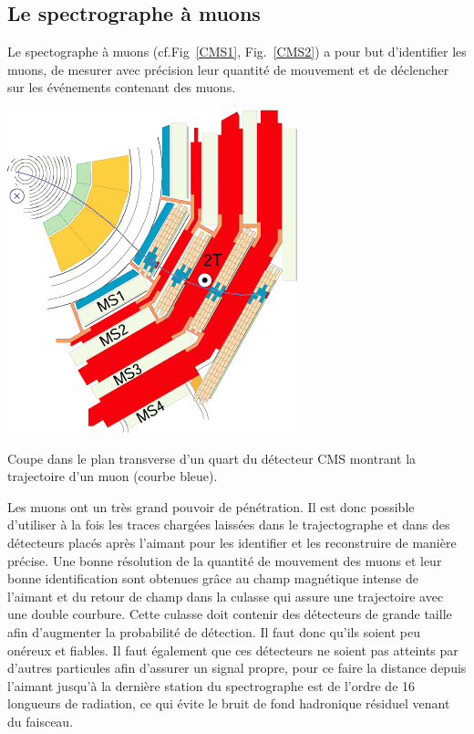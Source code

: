 \subsection{Le spectrographe à muons}
\label{RPCPRE}
Le spectographe à muons (cf.Fig~\ref{CMS1}, Fig.~\ref{CMS2}) a pour but d'identifier les muons, de mesurer avec précision leur quantité de mouvement et de déclencher sur les événements contenant des muons.
\marginpar
{
	\centering
	\includegraphics[width=\marginparwidth]{CMS/MUON.png}
	\captionsetup{type=figure}\caption{Coupe dans le plan transverse d'un quart du détecteur CMS montrant la trajectoire d'un muon (courbe bleue).}
	\label{MUON}
} Les muons ont un très grand pouvoir de pénétration. Il est donc possible d'utiliser à la fois les traces chargées laissées dans le trajectographe et dans des détecteurs placés après l'aimant pour les identifier et les reconstruire de manière précise. Une bonne résolution de la quantité de mouvement des muons et leur bonne identification sont obtenues grâce au champ magnétique intense de l'aimant et du retour de champ dans la culasse qui assure une trajectoire avec une double courbure. Cette culasse doit contenir des détecteurs de grande taille afin d'augmenter la probabilité de détection. Il faut donc qu'ils soient peu onéreux et fiables. Il faut également que ces détecteurs ne soient pas atteints par d'autres particules afin d'assurer un signal propre, pour ce faire la distance depuis l'aimant jusqu'à la dernière station du spectrographe est de l'ordre de \num{16} longueurs de radiation, ce qui évite le bruit de fond hadronique résiduel venant du faisceau.

